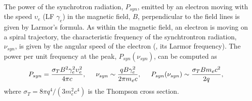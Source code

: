 %
%
The power of the synchrotron radiation, $P_{syn}$, emitted by an electron moving with 
the speed $\upsilon_e$ (\ac{LF} $\gamma_e$) in the magnetic field, $B$, perpendicular 
to the field lines is given by Larmor's formula.
%
As within the magnetic field, an electron is moving on a spiral trajectory,
the characteristic frequency of the synchtrontron radiation, $\nu_{syn}$, is given 
by the angular speed of the electron (\eg, its Larmor frequency).
%
The power per unit frequency at the peak, $P_{syn}(\nu_{syn})$, can be computed as 
\citep{RybickiLightman:1985}
%
\begin{equation}
P_{syn} = \frac{\sigma_TB^2\gamma_e^2\upsilon_e^2}{4\pi c}, 
\hspace{5mm} 
\nu_{syn} \sim \frac{q B \gamma_e^2}{2\pi m_e c},
\hspace{5mm}
P_{syn}(\nu_{syn}) \sim \frac{\sigma_T B m_e c^2}{2 q},
\end{equation}
%
where $\sigma_T = 8\pi q^4 / (3m_e^2c^4)$ is the Thompson cross section.

